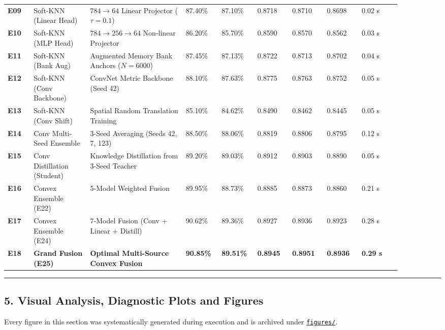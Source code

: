 \begin{longtable}[]{@{}p{0.06\linewidth}p{0.13\linewidth}p{0.22\linewidth}p{0.08\linewidth}p{0.08\linewidth}p{0.08\linewidth}p{0.08\linewidth}p{0.08\linewidth}p{0.09\linewidth}@{}}
\textbf{E09} & Soft-KNN (Linear Head) & \(784 \to 64\) Linear Projector
(\(\tau=0.1\)) & 87.40\% & 87.10\% & 0.8718 & 0.8710 & 0.8698 & 0.02
s \\
\textbf{E10} & Soft-KNN (MLP Head) & \(784 \to 256 \to 64\) Non-linear
Projector & 86.20\% & 85.70\% & 0.8590 & 0.8570 & 0.8562 & 0.03 s \\
\textbf{E11} & Soft-KNN (Bank Aug) & Augmented Memory Bank Anchors
(\(N=6000\)) & 87.45\% & 87.13\% & 0.8722 & 0.8713 & 0.8702 & 0.04 s \\
\textbf{E12} & Soft-KNN (Conv Backbone) & ConvNet Metric Backbone (Seed
42) & 88.10\% & 87.63\% & 0.8775 & 0.8763 & 0.8752 & 0.05 s \\
\textbf{E13} & Soft-KNN (Conv Shift) & Spatial Random Translation
Training & 85.10\% & 84.62\% & 0.8490 & 0.8462 & 0.8445 & 0.05 s \\
\textbf{E14} & Conv Multi-Seed Ensemble & 3-Seed Averaging (Seeds 42, 7,
123) & 88.50\% & 88.06\% & 0.8819 & 0.8806 & 0.8795 & 0.12 s \\
\textbf{E15} & Conv Distillation (Student) & Knowledge Distillation from
3-Seed Teacher & 89.20\% & 89.03\% & 0.8912 & 0.8903 & 0.8890 & 0.05
s \\
\textbf{E16} & Convex Ensemble (E22) & 5-Model Weighted Fusion & 89.95\%
& 88.73\% & 0.8885 & 0.8873 & 0.8860 & 0.21 s \\
\textbf{E17} & Convex Ensemble (E24) & 7-Model Fusion (Conv + Linear +
Distill) & 90.62\% & 89.36\% & 0.8927 & 0.8936 & 0.8923 & 0.28 s \\
\textbf{E18} & \textbf{Grand Fusion (E25)} & \textbf{Optimal
Multi-Source Convex Fusion} & \textbf{90.85\%} & \textbf{89.51\%} &
\textbf{0.8945} & \textbf{0.8951} & \textbf{0.8936} & \textbf{0.29 s} \\
\end{longtable}

\begin{center}\rule{0.5\linewidth}{0.5pt}\end{center}

\subsection{5. Visual Analysis, Diagnostic Plots and
Figures}\label{5-visual-analysis-diagnostic-plots-and-figures}

Every figure in this section was systematically generated during
execution and is archived under \href{figures/}{\texttt{figures/}}.


